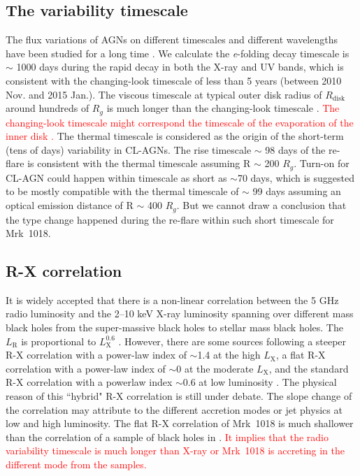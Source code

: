 \subsection{The variability timescale}
\label{sec:timescale}
The flux variations of AGNs on different timescales and different wavelengths have been studied for a long time \citep[see reviews in ][]{1997ARA&A..35..445U}. We calculate the \textit{e}-folding decay timescale is $\sim$ 1000 days  during the rapid decay in both the X-ray and UV bands, which is consistent with the changing-look timescale of less than 5 years (between 2010 Nov. and 2015 Jan.). The viscous timescale at typical outer disk radius of $R_\mathrm{disk}$ around hundreds of $R_g$ is much longer than the changing-look timescale \citep[see also][]{2012MmSAI..83..469L,2018MNRAS.475.1190Y}. \textcolor{red}{The changing-look timescale might correspond the timescale of the evaporation of the inner disk \citep{}.} The thermal timescale is considered as the origin of the short-term (tens of days) variability in CL-AGNs. The rise timescale $\sim$ 98 days of the re-flare is consistent with the thermal timescale assuming R $\sim$ 200 $R_g$. Turn-on for CL-AGN could happen within timescale as short as $\sim$70 days\citep[e.g.][]{2019MNRAS.487.4057K}, which is suggested to be mostly compatible with the thermal timescale of $\sim$ 99 days assuming an optical emission distance of R $\sim$ 400 $R_g$. But we cannot draw a conclusion that the type change happened during the re-flare within such short timescale for Mrk~1018.


\subsection{R-X correlation}
It is widely accepted that there is a non-linear correlation between the 5 GHz radio luminosity and the 2--10 keV X-ray luminosity spanning over different mass black holes from the super-massive black holes to stellar mass black holes. The $L_\mathrm{R}$ is proportional to $L_\mathrm{X}^{0.6}$ \citep{2003MNRAS.345.1057M,2004A&A...414..895F}. However, there are some sources following a steeper R-X correlation with a power-law index of $\sim$1.4 at the high $L_\mathrm{X}$, a flat R-X correlation with a power-law index of $\sim$0 at the moderate $L_\mathrm{X}$, and the standard R-X correlation with a powerlaw index $\sim$0.6 at low luminosity \citep[e.g.][]{2011MNRAS.414..677C,2014ApJ...788...52C,2016MNRAS.463.2287X}. The physical reason of this ``hybrid" R-X correlation is still under debate. The slope change of the correlation may attribute to the different accretion modes or jet physics at low and high luminosity\citep{2016MNRAS.456.4377X,2018MNRAS.481.4513I,2018MNRAS.473.4122E}. The flat R-X correlation of Mrk~1018 is much shallower than the correlation of a sample of black holes in \citet{2012MNRAS.419..267P}. \textcolor{red}{It implies that the radio variability timescale is much longer than X-ray or Mrk~1018 is accreting in the different mode from the samples. }


